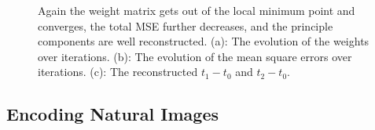 \begin{figure}
\centering
{}
\caption{Again the weight matrix gets out of the local minimum point and converges,
the total MSE further decreases, and the principle components are well reconstructed.
(a): The evolution of the weights over iterations.
(b): The evolution of the mean square errors over iterations.
(c): The reconstructed $t_1-t_0$ and $t_2-t_0$.}
\label{global_best}
\end{figure}

\subsection{Encoding Natural Images}

